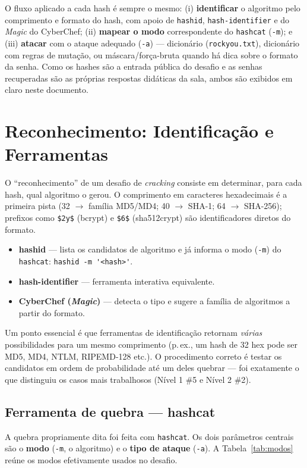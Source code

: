 \documentclass[12pt,a4paper]{article}
\newcommand{\cmd}[1]{\lstinline[style=shell]|#1|}
\begin{document}
O fluxo aplicado a cada hash é sempre o mesmo: (i) \textbf{identificar} o
algoritmo pelo comprimento e formato do hash, com apoio de \texttt{hashid},
\texttt{hash-identifier} e do \emph{Magic} do CyberChef; (ii) \textbf{mapear o
modo} correspondente do \texttt{hashcat} (\cmd{-m}); e (iii) \textbf{atacar} com
o ataque adequado (\cmd{-a}) --- dicionário (\texttt{rockyou.txt}), dicionário
com regras de mutação, ou máscara/força-bruta quando há dica sobre o formato da
senha. Como os hashes são a entrada pública do desafio e as senhas recuperadas
são as próprias respostas didáticas da sala, ambos são exibidos em claro neste
documento.

\section{Reconhecimento: Identificação e Ferramentas}

O ``reconhecimento'' de um desafio de \emph{cracking} consiste em determinar,
para cada hash, qual algoritmo o gerou.
O comprimento em caracteres hexadecimais é a primeira pista (32 $\rightarrow$
família MD5/MD4; 40 $\rightarrow$ SHA-1; 64 $\rightarrow$ SHA-256); prefixos como
\cmd{$2y$} (bcrypt) e \cmd{$6$} (sha512crypt) são identificadores diretos do
formato.

\begin{itemize}[leftmargin=1.4em,itemsep=2pt,topsep=2pt]
  \item \textbf{hashid} --- lista os candidatos de algoritmo e já informa o modo
        (\cmd{-m}) do \texttt{hashcat}: \cmd{hashid -m '<hash>'}.
  \item \textbf{hash-identifier} --- ferramenta interativa equivalente.
  \item \textbf{CyberChef (\emph{Magic})} --- detecta o tipo e sugere a família
        de algoritmos a partir do formato.
\end{itemize}

Um ponto essencial é que ferramentas de identificação retornam \emph{várias}
possibilidades para um mesmo comprimento (p.\,ex., um hash de 32 hex pode ser
MD5, MD4, NTLM, RIPEMD-128 etc.). O procedimento correto é testar os candidatos
em ordem de probabilidade até um deles quebrar --- foi exatamente o que
distinguiu os casos mais trabalhosos (Nível 1 \#5 e Nível 2 \#2).

\subsection{Ferramenta de quebra --- hashcat}
A quebra propriamente dita foi feita com \texttt{hashcat}. Os dois parâmetros
centrais são o \textbf{modo} (\cmd{-m}, o algoritmo) e o \textbf{tipo de ataque}
(\cmd{-a}). A Tabela~\ref{tab:modos} reúne os modos efetivamente usados no
desafio.
\end{document}

